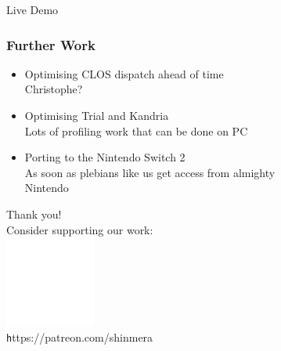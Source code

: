 \documentclass[14pt,t,aspectratio=169]{beamer}
\begin{document}
\begin{frame}[c]{ }
  \centering
  {\Huge Live Demo}
\end{frame}

\begin{frame}
  \frametitle{Further Work}
  \begin{itemize}
  \item Optimising CLOS dispatch ahead of time \\
    \Rightarrow{} Christophe? 
  \item Optimising Trial and Kandria \\
    \Rightarrow{} Lots of profiling work that can be done on PC
  \item Porting to the Nintendo Switch 2 \\
    \Rightarrow{} As soon as plebians like us get access from almighty \\\quad Nintendo
  \end{itemize}
\end{frame}

{
  \begin{frame}[c]{ }
    \centering\color{white}
    \vspace{2cm}
    {\LARGE Thank you!} \\
    \vspace{0.2cm}
    Consider supporting our work: \\
    \includegraphics[width=3cm]{patreon} \\
    {\texttt https://patreon.com/shinmera}
  \end{frame}}
\end{document}
